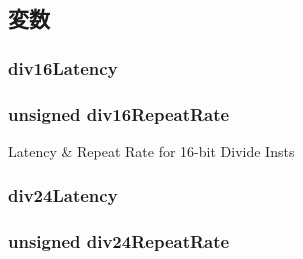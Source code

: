 \subsection{変数}
\hypertarget{classMultDivUnit_a68408b696b715c2a6d468f16451a4c98}{
\subsubsection[{div16Latency}]{ {\bf div16Latency}}}
\label{classMultDivUnit_a68408b696b715c2a6d468f16451a4c98}
\hypertarget{classMultDivUnit_a1c025245df3142725ae1dd58d13168d8}{
\subsubsection[{div16RepeatRate}]{\setlength{\rightskip}{0pt plus 5cm}unsigned {\bf div16RepeatRate}}}
\label{classMultDivUnit_a1c025245df3142725ae1dd58d13168d8}
Latency \& Repeat Rate for 16-\/bit Divide Insts \hypertarget{classMultDivUnit_a03f6d4fc8fa7ddd3d383f57f0c9e3a64}{
\subsubsection[{div24Latency}]{ {\bf div24Latency}}}
\label{classMultDivUnit_a03f6d4fc8fa7ddd3d383f57f0c9e3a64}
\hypertarget{classMultDivUnit_a0e2f13b87db0c3e86b59d16cfb2ed40c}{
\subsubsection[{div24RepeatRate}]{\setlength{\rightskip}{0pt plus 5cm}unsigned {\bf div24RepeatRate}}}
